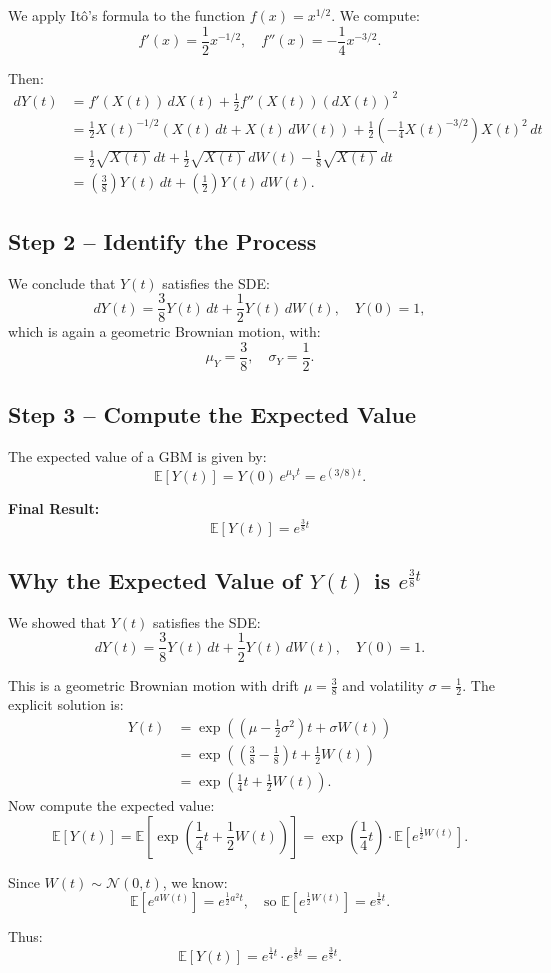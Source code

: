 We apply Itô's formula to the function \( f(x) = x^{1/2} \). We compute:
\[
f'(x) = \frac{1}{2} x^{-1/2}, \quad f''(x) = -\frac{1}{4} x^{-3/2}.
\]

Then:
\[
\begin{aligned}
dY(t) &= f'(X(t))\,dX(t) + \frac{1}{2} f''(X(t)) (dX(t))^2 \\
&= \frac{1}{2} X(t)^{-1/2} \left( X(t)\,dt + X(t)\,dW(t) \right) 
+ \frac{1}{2} \left( -\frac{1}{4} X(t)^{-3/2} \right) X(t)^2\,dt \\
&= \frac{1}{2} \sqrt{X(t)}\,dt + \frac{1}{2} \sqrt{X(t)}\,dW(t) 
- \frac{1}{8} \sqrt{X(t)}\,dt \\
&= \left( \frac{3}{8} \right) Y(t)\,dt + \left( \frac{1}{2} \right) Y(t)\,dW(t).
\end{aligned}
\]

\subsection*{Step 2 – Identify the Process}

We conclude that \( Y(t) \) satisfies the SDE:
\[
dY(t) = \frac{3}{8} Y(t)\,dt + \frac{1}{2} Y(t)\,dW(t), \quad Y(0) = 1,
\]
which is again a geometric Brownian motion, with:
\[
\mu_Y = \frac{3}{8}, \quad \sigma_Y = \frac{1}{2}.
\]

\subsection*{Step 3 – Compute the Expected Value}

The expected value of a GBM is given by:
\[
\mathbb{E}[Y(t)] = Y(0)\,e^{\mu_Y t} = e^{(3/8)t}.
\]

\textbf{Final Result:}
\[
\boxed{ \mathbb{E}[Y(t)] = e^{\frac{3}{8} t} }
\]
\subsection*{Why the Expected Value of \( Y(t) \) is \( e^{\frac{3}{8}t} \)}

We showed that \( Y(t) \) satisfies the SDE:
\[
dY(t) = \frac{3}{8} Y(t)\,dt + \frac{1}{2} Y(t)\,dW(t), \quad Y(0) = 1.
\]

This is a geometric Brownian motion with drift \( \mu = \frac{3}{8} \) and volatility \( \sigma = \frac{1}{2} \). The explicit solution is:
\begin{align*}
Y(t) &= \exp\left( \left( \mu - \frac{1}{2} \sigma^2 \right)t + \sigma W(t) \right) \\
     &= \exp\left( \left( \frac{3}{8} - \frac{1}{8} \right)t + \frac{1}{2} W(t) \right) \\
     &= \exp\left( \frac{1}{4}t + \frac{1}{2} W(t) \right).
\end{align*}
Now compute the expected value:
\[
\mathbb{E}[Y(t)] = \mathbb{E}\left[ \exp\left( \frac{1}{4}t + \frac{1}{2} W(t) \right) \right]
= \exp\left( \frac{1}{4}t \right) \cdot \mathbb{E}\left[ e^{\frac{1}{2} W(t)} \right].
\]

Since \( W(t) \sim \mathcal{N}(0, t) \), we know:
\[
\mathbb{E}[e^{a W(t)}] = e^{\frac{1}{2} a^2 t},
\quad \text{so } \mathbb{E}[e^{\frac{1}{2} W(t)}] = e^{\frac{1}{8} t}.
\]

Thus:
\[
\mathbb{E}[Y(t)] = e^{\frac{1}{4}t} \cdot e^{\frac{1}{8}t} = \boxed{e^{\frac{3}{8}t}}.
\]